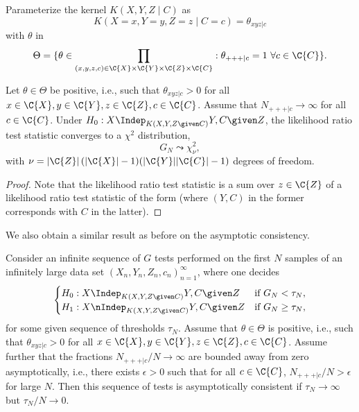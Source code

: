 Parameterize the kernel $K(X,Y,Z \mid C)$ as
$$K(X=x,Y=y,Z=z \mid C=c) = \theta_{xyz|c}$$
with $\theta$ in 
$$\Theta = \{ \theta \in \prod_{(x,y,z,c) \in \C{X}\times\C{Y}\times\C{Z}\times\C{C}} : \theta_{+++|c} = 1 \ \forall c\in\C{C} \}.$$
\begin{Prp}\label{prp:general_G_test_asymptotics_H0}
  Let $\theta \in \Theta$ be positive, i.e., such that $\theta_{xyz|c} > 0$ for all $x \in \C{X}, y \in \C{Y}, z \in \C{Z}, c \in \C{C}$.
  Assume that $N_{+++|c} \to \infty$ for all $c \in \C{C}$.
  Under $H_0 : X \Indep_{K(X,Y,Z \given C)} Y,C \given Z$, the likelihood ratio test statistic  converges
  to a $\chi^2$ distribution,
  $$G_N \leadsto \chi^2_\nu,$$
  with $\nu = |\C{Z}|\,(|\C{X}| - 1)(|\C{Y}||\C{C}| - 1)$ degrees of freedom.
\end{Prp}
\begin{proof}
  Note that the likelihood ratio test statistic  is a sum
  over $z \in \C{Z}$ of a likelihood ratio test statistic of the form 
   (where $(Y,C)$ in the former corresponds with $C$ in the latter). 
\end{proof}
We also obtain a similar result as before on the asymptotic consistency.
\begin{Cor}\label{cor:gen_G_test_consistency}
Consider an infinite sequence of $G$ tests performed on the first $N$ samples of an infinitely large
data set $(X_n,Y_n,Z_n,c_n)_{n=1}^\infty$,
where one decides
  $$\begin{cases}
    H_0 : X \Indep_{K(X,Y,Z \given C)} Y,C \given Z     & \text{if $G_N < \tau_N$},\\
    H_1 : X \nIndep_{K(X,Y,Z \given C)} Y,C \given Z & \text{if $G_N \ge \tau_N$,}
  \end{cases}$$
for some given sequence of thresholds $\tau_N$.
Assume that $\theta \in \Theta$ is positive, i.e., such that $\theta_{xyz|c} > 0$ for all $x \in \C{X}, y \in \C{Y}, z \in \C{Z}, c \in \C{C}$.
Assume further that the fractions $N_{+++|c} / N \to \infty$ are bounded away from zero asymptotically,
i.e., there exists $\epsilon > 0$ such that for all $c \in \C{C}$, $N_{+++|c} / N > \epsilon$ for large $N$.
Then this sequence of tests is asymptotically consistent if $\tau_N \to \infty$ but $\tau_N / N \to 0$.
\end{Cor}

